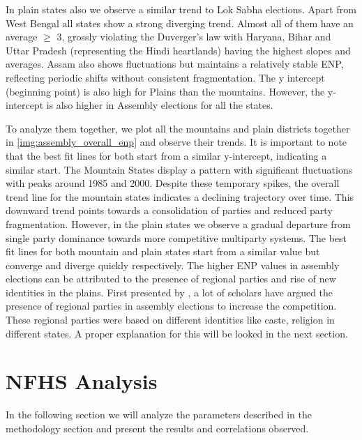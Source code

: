  In plain states also we observe a similar trend to Lok Sabha elections. Apart from West Bengal all states show a strong diverging trend. Almost all of them have an average $\geq$ 3, grossly violating the Duverger's law with Haryana, Bihar and Uttar Pradesh (representing the Hindi heartlands) having the highest slopes and averages.  Assam also shows fluctuations but maintains a relatively stable ENP, reflecting periodic shifts without consistent fragmentation. The y intercept (beginning point) is also high for Plains than the mountains. However, the y-intercept is also higher in Assembly elections for all the states. 


To analyze them together, we plot all the mountains and plain districts together in \ref{img:assembly_overall_enp} and observe their trends. It is important to note that the best fit lines for both start from a similar y-intercept, indicating a similar start. The Mountain States display a pattern with significant fluctuations with peaks around 1985 and 2000. Despite these temporary spikes, the overall trend line for the mountain states indicates a declining trajectory over time. This downward trend points towards a consolidation of parties and reduced party fragmentation. However, in the plain states we observe a gradual departure from single party dominance towards more competitive multiparty systems. The best fit lines for both mountain and plain states start from a similar value but converge and diverge quickly respectively. The higher ENP values in assembly elections can be attributed to the presence of regional parties and rise of new identities in the plains. First presented by \citep{lijphart1994}, a lot of scholars have argued the presence of regional parties in assembly elections to increase the competition. These regional parties were based on different identities like caste, religion in different states. A proper explanation for this will be looked in the next section.




\section{NFHS Analysis}
In the following section we will analyze the parameters described in the methodology section and present the results and correlations observed.
